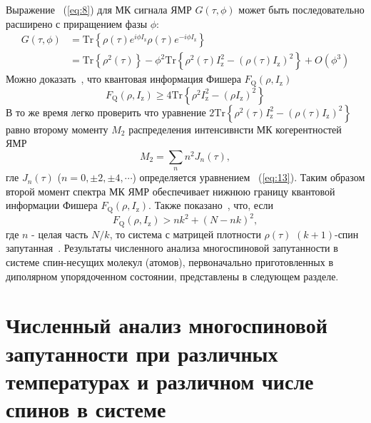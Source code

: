 \documentclass[review]{elsarticle}
\begin{document}
Выражение ~(\ref{eq:8}) для МК сигнала ЯМР $G(\tau,\phi)$ может быть последовательно расширено с приращением фазы $\phi$:
%
\begin{equation}
    \begin{split}
        \label{eq:17}
        G(\tau,\phi)  
        & = \mathrm{Tr} \left\{ 
            \rho(\tau) e^{i \phi I_\mathrm{z} }
            \rho(\tau) e^{-i\phi I_\mathrm{z}}
        \right\}  \\
        & = \mathrm{Tr} \left\{ \rho^2(\tau) \right\} 
        - \phi^2 \mathrm{Tr} \left\{ 
            \rho^2(\tau) I^2_\mathrm{z} 
            - (\rho(\tau) I_\mathrm{z})^2
        \right\} 
        + O(\phi^3)
    \end{split}
\end{equation}
%
Можно доказать~\cite{Girolami_2017}, что квантовая информация Фишера $F_\mathrm{Q}(\rho,I_\mathrm{z})$~\cite{Helstrom_1976}
%
\begin{equation}
    \label{eq:18}
    F_\mathrm{Q}(\rho,I_\mathrm{z}) \geq 4 \mathrm{Tr} \left\{ \rho^2 I^2_\mathrm{z} - (\rho I_\mathrm{z})^2 \right\}
\end{equation}
%
В то же время легко проверить что уравнение $2 \mathrm{Tr} \left\{ \rho^2(\tau) I_\mathrm{z}^2 - \left( \rho(\tau) I_\mathrm{z} \right)^2 \right\}$ равно второму моменту $M_2$ распределения интенсивнсти МК когерентностей ЯМР~\cite{Khitrin_1997}
%
\begin{equation}
    \label{eq:19}
    M_2 = \sum_{n} n^2 J_n (\tau) ,
\end{equation}
%
гле $J_n(\tau)$ ($n=0,\pm 2, \pm 4, \cdots$) определяется уравнением ~(\ref{eq:13}).
Таким образом второй момент спектра МК ЯМР обеспечивает нижнюю границу квантовой информации Фишера $F_\mathrm{Q}(\rho,I_\mathrm{z})$.
Также показано~\cite{T_th_2014,Pezz__2018}, что, если
%
\begin{equation}
    \label{eq:20}
    F_\mathrm{Q} (\rho,I_\mathrm{z}) > n k^2 + (N - n k)^2,
\end{equation}
%
где $n$ - целая часть ${N/k}$, то система с матрицей плотности $\rho(\tau)$ $(k+1)$-спин запутанная~\cite{Pezz__2009,Hyllus_2012,T_th_2012}.
Результаты численного анализа многоспиновой запутанности в системе спин-несущих молекул (атомов), первоначально приготовленных в диполярном упорядоченном состоянии, представлены в следующем разделе.



\section{Численный анализ многоспиновой запутанности при различных температурах и различном числе спинов в системе}
\label{sec:5}
\end{document}
